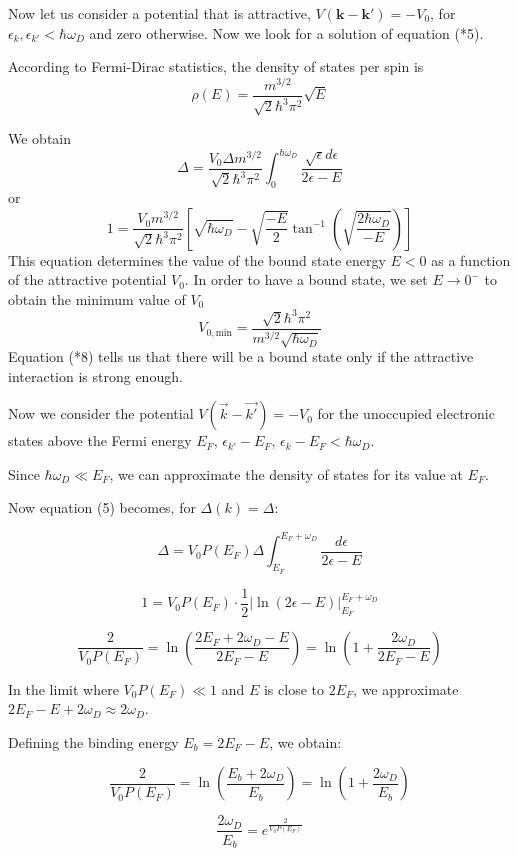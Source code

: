 \documentclass{article}
\begin{document}
Now let us consider a potential that is attractive, $V(\mathbf{k} - \mathbf{k'}) = -V_0$, for $\epsilon_k, \epsilon_{k'} < \hbar \omega_D$ and zero otherwise. Now we look for a solution of equation (*5).

According to Fermi-Dirac statistics, the density of states per spin is
\[
\rho(E) = \frac{m^{3/2}}{\sqrt{2} \hbar^3 \pi^2} \sqrt{E} \tag{*6}
\]

We obtain
\[
\Delta = \frac{V_0 \Delta m^{3/2}}{\sqrt{2} \hbar^3 \pi^2} \int_0^{\hbar \omega_D} \frac{\sqrt{\epsilon} d\epsilon}{2\epsilon - E} \tag{*7}
\]
or
\[
1 = \frac{V_0 m^{3/2}}{\sqrt{2} \hbar^3 \pi^2} \left[ \sqrt{\hbar \omega_D} - \sqrt{\frac{-E}{2}} \tan^{-1}\left( \sqrt{\frac{2\hbar \omega_D}{-E}} \right) \right]
\]
This equation determines the value of the bound state energy $E < 0$ as a function of the attractive potential $V_0$. In order to have a bound state, we set $E \to 0^-$ to obtain the minimum value of $V_0$
\[
V_{0, \text{min}} = \frac{\sqrt{2} \hbar^3 \pi^2}{m^{3/2} \sqrt{\hbar \omega_D}} \tag{*8}
\]
Equation (*8) tells us that there will be a bound state only if the attractive interaction is strong enough.

Now we consider the potential \( V(\vec{k} - \vec{k'}) = -V_0 \) for the unoccupied electronic states above the Fermi energy \( E_F \), \( \epsilon_{k'} - E_F \), \( \epsilon_k - E_F < \hbar \omega_D \).

Since \( \hbar \omega_D \ll E_F \), we can approximate the density of states for its value at \( E_F \).

Now equation (5) becomes, for \( \Delta(k) = \Delta \):

\[
\Delta = V_0 P(E_F) \Delta \int_{E_F}^{E_F + \omega_D} \frac{d\epsilon}{2\epsilon - E}
\]

\[
1 = V_0 P(E_F) \cdot \frac{1}{2} \left| \ln(2\epsilon - E) \right|_{E_F}^{E_F + \omega_D}
\]

\[
\frac{2}{V_0 P(E_F)} = \ln \left( \frac{2E_F + 2\omega_D - E}{2E_F - E} \right) = \ln \left( 1 + \frac{2\omega_D}{2E_F - E} \right)
\]

In the limit where \( V_0 P(E_F) \ll 1 \) and \( E \) is close to \( 2E_F \), we approximate \( 2E_F - E + 2\omega_D \approx 2\omega_D \).

Defining the binding energy \( E_b = 2E_F - E \), we obtain:

\[
\frac{2}{V_0 P(E_F)} = \ln \left( \frac{E_b + 2\omega_D}{E_b} \right) = \ln \left( 1 + \frac{2\omega_D}{E_b} \right)
\]

\[
\frac{2\omega_D}{E_b} = e^{\frac{2}{V_0 P(E_F)}}
\]
\end{document}
